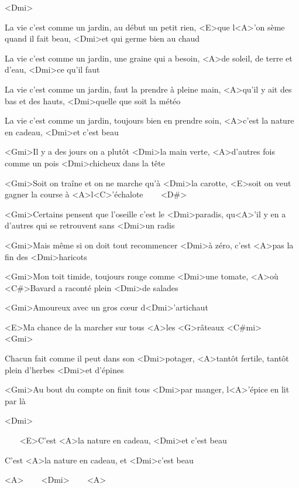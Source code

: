 

<Dmi>

\zr
La vie c'est comme un jardin, au début un petit rien, <E>que l<A>'on sème quand il fait beau, <Dmi>et qui germe bien au chaud

La vie c'est comme un jardin, une graine qui a besoin, <A>de soleil, de terre et d'eau, <Dmi>ce qu'il faut

La vie c'est comme un jardin, faut la prendre à pleine main, <A>qu'il y ait des bas et des hauts, <Dmi>quelle que soit la météo

La vie c'est comme un jardin, toujours bien en prendre soin, <A>c'est la nature en cadeau, <Dmi>et c'est beau
\kr

\zs
<Gmi>Il y a des jours on a plutôt <Dmi>la main verte, <A>d'autres fois comme un pois <Dmi>chicheux dans la tête

<Gmi>Soit on traîne et on ne marche qu'à <Dmi>la carotte, <E>soit on veut gagner la course à <A>l<C>'échalote ~~~ <D#>
\ks

\zs
<Gmi>Certains pensent que l'oseille c'est le <Dmi>paradis, qu<A>'il y en a d'autres qui se retrouvent sans <Dmi>un radis

<Gmi>Mais même si on doit tout recommencer <Dmi>à zéro, c'est <A>pas la fin des <Dmi>haricots
\ks

\zr\kr

\zs
<Gmi>Mon toit timide, toujours rouge comme <Dmi>une tomate, <A>où <C#>Bavard a raconté plein <Dmi>de salades

<Gmi>Amoureux avec un gros cœur d<Dmi>'artichaut

<E>Ma chance de la marcher sur tous <A>les <G>râteaux <C#mi> ~~~ <Gmi>
\ks

\zs
Chacun fait comme il peut dans son <Dmi>potager, <A>tantôt fertile, tantôt plein d'herbes <Dmi>et d'épines

<Gmi>Au bout du compte on finit tous <Dmi>par manger, l<A>'épice en lit par là
\ks

<Dmi>

\zr\kr

\zs
~~~ <E>C'est <A>la nature en cadeau, <Dmi>et c'est beau

C'est <A>la nature en cadeau, et <Dmi>c'est beau
\ks

<A> ~~~ <Dmi> ~~~ <A>

\kp
